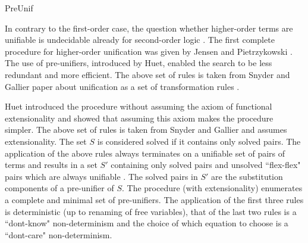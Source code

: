 \begin{entry}{PreUnif}
 \begin{history}
   In contrary to the first-order case,
   the question whether higher-order terms are unifiable is
   undecidable already for second-order logic \cite{goldfarb81tcs}.
   The first complete procedure for higher-order unification was given by
   Jensen and Pietrzykowski \cite{jensen76tcs}.
   The use of pre-unifiers, introduced by Huet, enabled the search to
   be less redundant and more efficient.
   The above set of rules is taken from Snyder and Gallier paper about unification
   as a set of transformation rules \cite{Snyder1989101}.
 \end{history}

\begin{technicalities}
  Huet \cite{huet75tcs} introduced the procedure without assuming
  the axiom of functional extensionality and showed that assuming this axiom
  makes the procedure simpler.
  The above set of rules is taken from Snyder and Gallier \cite{Snyder1989101}
  and assumes extensionality.
The set $S$ is considered
   solved if it contains only solved pairs.
   The application of the above rules always terminates on a unifiable set of pairs of terms
   and results in a set $S'$ containing only solved pairs and unsolved ``flex-flex"
  pairs which are always unifiable .
   The solved pairs in $S'$ are the substitution components \cite{Robinson1965JACM} of a pre-unifier of $S$.
   The procedure (with extensionality) enumerates a complete and minimal set of pre-unifiers.
  The application of the first three rules is deterministic (up to renaming of free variables),
  that of the last two rules is
  a ``dont-know" non-determinism and  the choice of which equation to choose
  is a ``dont-care" non-determinism.
 \end{technicalities}



%
%
%
%
%
%
%
%




\end{entry}
